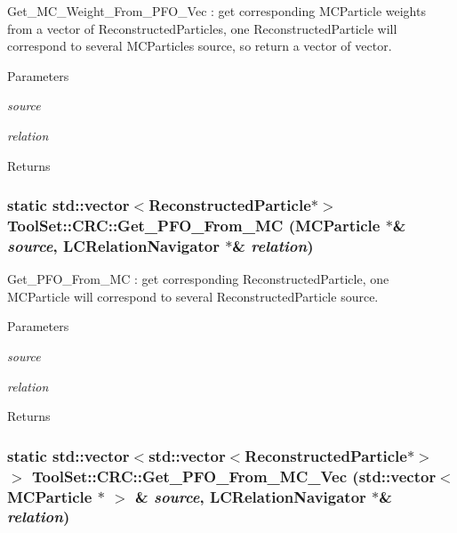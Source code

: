 Get\_\-MC\_\-Weight\_\-From\_\-PFO\_\-Vec : get corresponding MCParticle weights from a vector of ReconstructedParticles, one ReconstructedParticle will correspond to several MCParticles source, so return a vector of vector. 
\begin{DoxyParams}{Parameters}
\item[{\em source}]\item[{\em relation}]\end{DoxyParams}
\begin{DoxyReturn}{Returns}

\end{DoxyReturn}
\hypertarget{classToolSet_1_1CRC_a1e8af238303782e448edc47f58fb01ab}{
\subsubsection[{Get\_\-PFO\_\-From\_\-MC}]{\setlength{\rightskip}{0pt plus 5cm}static std::vector$<$ReconstructedParticle$\ast$$>$ ToolSet::CRC::Get\_\-PFO\_\-From\_\-MC (MCParticle $\ast$\& {\em source}, \/  LCRelationNavigator $\ast$\& {\em relation})}}
\label{classToolSet_1_1CRC_a1e8af238303782e448edc47f58fb01ab}


Get\_\-PFO\_\-From\_\-MC : get corresponding ReconstructedParticle, one MCParticle will correspond to several ReconstructedParticle source. 
\begin{DoxyParams}{Parameters}
\item[{\em source}]\item[{\em relation}]\end{DoxyParams}
\begin{DoxyReturn}{Returns}

\end{DoxyReturn}
\hypertarget{classToolSet_1_1CRC_adb838e10bbaaabbcc8bba3b2cf3b67f8}{
\subsubsection[{Get\_\-PFO\_\-From\_\-MC\_\-Vec}]{\setlength{\rightskip}{0pt plus 5cm}static std::vector$<$std::vector$<$ReconstructedParticle$\ast$$>$ $>$ ToolSet::CRC::Get\_\-PFO\_\-From\_\-MC\_\-Vec (std::vector$<$ MCParticle $\ast$ $>$ \& {\em source}, \/  LCRelationNavigator $\ast$\& {\em relation})}}
\label{classToolSet_1_1CRC_adb838e10bbaaabbcc8bba3b2cf3b67f8}


